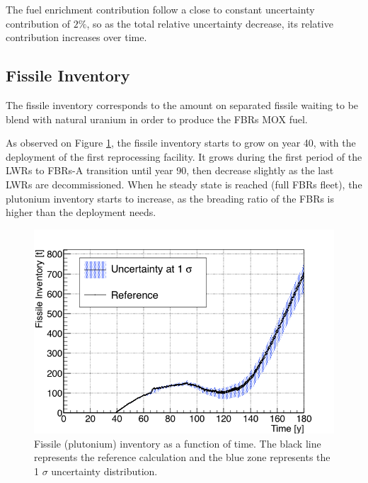\documentclass{anstrans}
\begin{document}
The fuel enrichment contribution follow a close to constant uncertainty
contribution of $2\%$, so as the total relative uncertainty decrease, its
relative contribution increases over time.

\subsection{Fissile Inventory}
The fissile inventory corresponds to the amount on separated fissile waiting to
be blend with natural uranium in order to produce the \glspl{FBR} MOX fuel.

As observed on Figure \ref{fig:pu_full}, the fissile inventory starts to grow on
year 40, with the deployment of the first reprocessing facility.  It grows
during the first period of the \glspl{LWR} to \glspl{FBR}-A transition until
year 90, then decrease slightly as the last \glspl{LWR} are decommissioned.
When he steady state is reached (full \glspl{FBR} fleet), the plutonium
inventory starts to increase, as the breading ratio of the \glspl{FBR} is higher
than the deployment needs.

\begin{figure}[ht] %
    \centering
    \includegraphics[scale=0.35]{pu_full}
    \caption{Fissile (plutonium) inventory as a function of time.  The black line
        represents the reference calculation and the blue zone
        represents the 1 $\sigma$ uncertainty distribution.}\label{fig:pu_full}
\end{figure}
\end{document}
